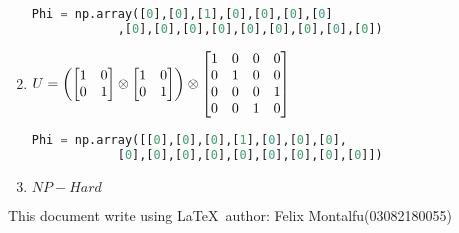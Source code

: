 \documentclass[a4paper]{article}
\begin{document}
\begin{enumerate}[1.]
        \begin{lstlisting}[language=Python]
            Phi = np.array([0],[0],[1],[0],[0],[0],[0]
            ,[0],[0],[0],[0],[0],[0],[0],[0],[0])
        \end{lstlisting}
        \item $U = \left(\begin{bmatrix}1 & 0 \\ 0 & 1\end{bmatrix} \otimes \begin{bmatrix}1 & 0 \\ 0 & 1\end{bmatrix}\right) \otimes \begin{bmatrix}1 & 0 & 0 & 0 \\ 0 & 1 & 0 & 0 \\ 0 & 0 & 0 & 1 \\ 0 & 0 & 1 & 0\end{bmatrix}\\$
        \begin{lstlisting}[language=Python]
            Phi = np.array([[0],[0],[0],[1],[0],[0],[0],
            [0],[0],[0],[0],[0],[0],[0],[0],[0]])
        \end{lstlisting}
        \item $NP - Hard$
    \end{enumerate}
    This document write using \LaTeX \ author: Felix Montalfu(03082180055)
\end{document}
